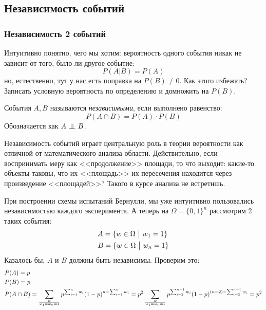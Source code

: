 \subsection{Независимость событий}

\subsubsection*{Независимость 2 событий}

\begin{note}
	Интуитивно понятно, чего мы хотим: вероятность одного события никак не зависит от того, было ли другое событие:
	\[
		P(A | B) = P(A)
	\]
	но, естественно, тут у нас есть поправка на $P(B) \neq 0$. Как этого избежать? Записать условную вероятность по определению и домножить на $P(B)$.
\end{note}

\begin{definition}
	События $A, B$ называются \textit{независимыми}, если выполнено равенство:
	\[
		P(A \cap B) = P(A) \cdot P(B)
	\]
	Обозначается как $A \perp\mkern-9.5mu\perp B$.
\end{definition}

\begin{note}
	Независимость событий играет центральную роль в теории вероятности как отличной от математического анализа области. Действительно, если воспринимать меру как <<продолжение>> площади, то что выходит: какие-то объекты таковы, что их <<площадь>> их пересечения находится через произведение <<площадей>>? Такого в курсе анализа не встретишь.
\end{note}

\begin{example}
	При построении схемы испытаний Бернулли, мы уже интуитивно пользовались независимостью каждого эксперимента. А теперь на $\Omega = \{0, 1\}^n$ рассмотрим 2 таких события:
	\begin{align*}
		&{A = \{w \in \Omega \ \big|\  w_1 = 1\}}
		\\
		&{B = \{w \in \Omega \ \big|\  w_n = 1\}}
	\end{align*}
	Казалось бы, $A$ и $B$ должны быть независимы. Проверим это:
	\begin{align*}
		&{P(A) = p}
		\\
		&{P(B) = p}
		\\
		&{P(A \cap B) = \sum_{w \over w_1 = w_n = 1} p^{\sum_{i = 1}^n w_i} (1 - p)^{n - \sum_{i = 1}^n w_i}} = p^2 \sum_{w \over w_1 = w_n = 1} p^{\sum_{i = 2}^{n - 1} w_i} (1 - p)^{(n - 2) - \sum_{i = 2}^{n - 1} w_i} = p^2
	\end{align*}
\end{example}

